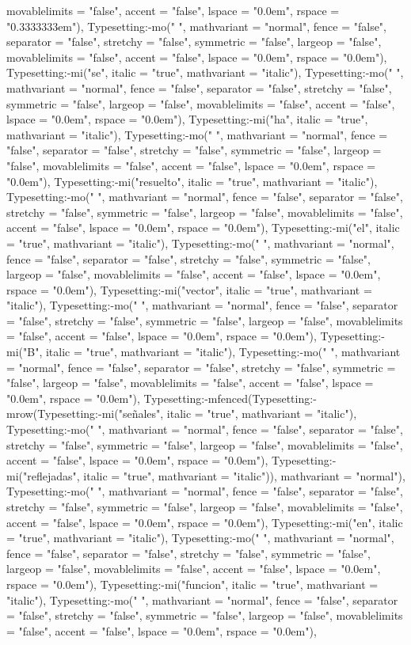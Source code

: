 \documentclass{article}
\begin{document}
\begin{Maple Normal}
{\begin{Maple Normal}
{movablelimits = "false", accent = "false", lspace = "0.0em", rspace = "0.3333333em"), Typesetting:-mo(" ", mathvariant = "normal", fence = "false", separator = "false", stretchy = "false", symmetric = "false", largeop = "false", movablelimits = "false", accent = "false", lspace = "0.0em", rspace = "0.0em"), Typesetting:-mi("se", italic = "true", mathvariant = "italic"), Typesetting:-mo(" ", mathvariant = "normal", fence = "false", separator = "false", stretchy = "false", symmetric = "false", largeop = "false", movablelimits = "false", accent = "false", lspace = "0.0em", rspace = "0.0em"), Typesetting:-mi("ha", italic = "true", mathvariant = "italic"), Typesetting:-mo(" ", mathvariant = "normal", fence = "false", separator = "false", stretchy = "false", symmetric = "false", largeop = "false", movablelimits = "false", accent = "false", lspace = "0.0em", rspace = "0.0em"), Typesetting:-mi("resuelto", italic = "true", mathvariant = "italic"), Typesetting:-mo(" ", mathvariant = "normal", fence = "false", separator = "false", stretchy = "false", symmetric = "false", largeop = "false", movablelimits = "false", accent = "false", lspace = "0.0em", rspace = "0.0em"), Typesetting:-mi("el", italic = "true", mathvariant = "italic"), Typesetting:-mo(" ", mathvariant = "normal", fence = "false", separator = "false", stretchy = "false", symmetric = "false", largeop = "false", movablelimits = "false", accent = "false", lspace = "0.0em", rspace = "0.0em"), Typesetting:-mi("vector", italic = "true", mathvariant = "italic"), Typesetting:-mo(" ", mathvariant = "normal", fence = "false", separator = "false", stretchy = "false", symmetric = "false", largeop = "false", movablelimits = "false", accent = "false", lspace = "0.0em", rspace = "0.0em"), Typesetting:-mi("B", italic = "true", mathvariant = "italic"), Typesetting:-mo(" ", mathvariant = "normal", fence = "false", separator = "false", stretchy = "false", symmetric = "false", largeop = "false", movablelimits = "false", accent = "false", lspace = "0.0em", rspace = "0.0em"), Typesetting:-mfenced(Typesetting:-mrow(Typesetting:-mi("señales", italic = "true", mathvariant = "italic"), Typesetting:-mo(" ", mathvariant = "normal", fence = "false", separator = "false", stretchy = "false", symmetric = "false", largeop = "false", movablelimits = "false", accent = "false", lspace = "0.0em", rspace = "0.0em"), Typesetting:-mi("reflejadas", italic = "true", mathvariant = "italic")), mathvariant = "normal"), Typesetting:-mo(" ", mathvariant = "normal", fence = "false", separator = "false", stretchy = "false", symmetric = "false", largeop = "false", movablelimits = "false", accent = "false", lspace = "0.0em", rspace = "0.0em"), Typesetting:-mi("en", italic = "true", mathvariant = "italic"), Typesetting:-mo(" ", mathvariant = "normal", fence = "false", separator = "false", stretchy = "false", symmetric = "false", largeop = "false", movablelimits = "false", accent = "false", lspace = "0.0em", rspace = "0.0em"), Typesetting:-mi("funcion", italic = "true", mathvariant = "italic"), Typesetting:-mo(" ", mathvariant = "normal", fence = "false", separator = "false", stretchy = "false", symmetric = "false", largeop = "false", movablelimits = "false", accent = "false", lspace = "0.0em", rspace = "0.0em"), }
\end{Maple Normal}}
\end{Maple Normal}
\end{document}
